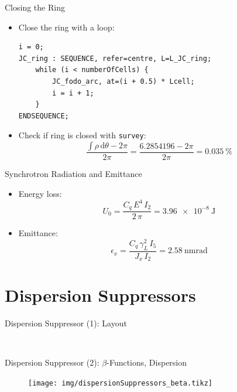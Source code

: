 \documentclass{beamer}
\begin{document}
\begin{frame}[t,fragile]{Closing the Ring}
\begin{itemize}
\item Close the ring with a loop:
\begin{lstlisting}
i = 0;
JC_ring : SEQUENCE, refer=centre, L=L_JC_ring; 
    while (i < numberOfCells) {
        JC_fodo_arc, at=(i + 0.5) * Lcell;
        i = i + 1;
    }
ENDSEQUENCE;
\end{lstlisting}
\item Check if ring is closed with \texttt{survey}:
\begin{equation*}
\frac{\int\rho\,\text{d}\theta-2\pi}{2\pi}=\frac{\num{6.2854196}-2\pi}{2\pi}=\SI{0.035}{\percent}
\end{equation*}
\end{itemize}
\end{frame}

\begin{frame}[t]{Synchrotron Radiation and Emittance}
\begin{itemize}
\item Energy loss:
\begin{equation*}
U_0 = \frac{C_q\,E^4\,I_2}{2\,\pi}=\SI{3.96e-8}{\joule}
\end{equation*}
\item Emittance:
\begin{equation*}
\epsilon_x = \frac{C_q\,\gamma_L^2\,I_5}{J_x\,I_2}=\SI{2.58}{\nano\meter\radian}
\end{equation*}
\end{itemize}
\end{frame}





\section{Dispersion Suppressors}
\begin{frame}[t]{Dispersion Suppressor (1): Layout}
\begin{figure}
  \centering
  \\
\end{figure}
\end{frame}

\begin{frame}[t,fragile]{Dispersion Suppressor (2): $\beta$-Functions, Dispersion}
\begin{figure}
\centering
\texttt{[image: img/dispersionSuppressors\_beta.tikz]}
\end{figure}
\end{frame}
\end{document}
